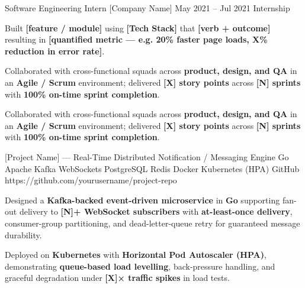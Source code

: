 \documentclass{bhaumic}
\begin{document}
\expentry
  {Software Engineering Intern}
  {[Company Name]}
  {May 2021 – Jul 2021}
  {Internship}
  {
    \begin{resbullets}
      \item Built \textbf{[feature / module]} using \textbf{[Tech Stack]} that
            \textbf{[verb + outcome]} resulting in \textbf{[quantified metric — e.g. 20\% faster
            page loads, X\% reduction in error rate]}.

      \item Collaborated with cross-functional squads across \textbf{product, design, and QA}
            in an \textbf{Agile / Scrum} environment; delivered \textbf{[X] story points}
            across \textbf{[N] sprints} with \textbf{100\% on-time sprint completion}.

      \item Collaborated with cross-functional squads across \textbf{product, design, and QA}
            in an \textbf{Agile / Scrum} environment; delivered \textbf{[X] story points}
            across \textbf{[N] sprints} with \textbf{100\% on-time sprint completion}.
    \end{resbullets}
  }



\begin{samepage}
\projentry
  {[Project Name] — Real-Time Distributed Notification / Messaging Engine}
  {Go \textbullet{} Apache Kafka \textbullet{} WebSockets \textbullet{} PostgreSQL \textbullet{} Redis \textbullet{} Docker \textbullet{} Kubernetes (HPA)}
  {GitHub}
  {https://github.com/yourusername/project-repo}
  {
    \begin{resbullets}
      \item Designed a \textbf{Kafka-backed event-driven microservice} in \textbf{Go}
            supporting fan-out delivery to \textbf{[N]+ WebSocket subscribers} with
            \textbf{at-least-once delivery}, consumer-group partitioning,
            and dead-letter-queue retry for guaranteed message durability.

      \item Deployed on \textbf{Kubernetes} with \textbf{Horizontal Pod Autoscaler (HPA)},
            demonstrating \textbf{queue-based load levelling}, back-pressure handling,
            and graceful degradation under \textbf{[X]× traffic spikes} in load tests.
    \end{resbullets}
  }
\end{samepage}
\end{document}
